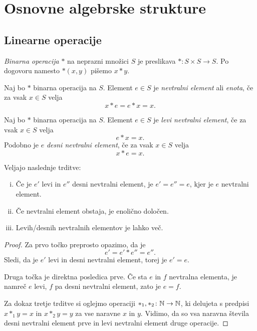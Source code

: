 \section{Osnovne algebrske strukture}

\subsection{Linearne operacije}

\begin{definicija}
\emph{Binarna operacija} $*$ na neprazni množici $S$ je preslikava $*\colon S\times S\to S$. Po dogovoru namesto $*(x,y)$ pišemo $x*y$.
\end{definicija}

\begin{definicija}
Naj bo $*$ binarna operacija na $S$. Element $e\in S$ je \emph{nevtralni element} ali \emph{enota}, če za vsak $x\in S$ velja
\[
x*e=e*x=x.
\]
\end{definicija}

\begin{definicija}
Naj bo $*$ binarna operacija na $S$. Element $e\in S$ je \emph{levi nevtralni element}, če za vsak $x\in S$ velja
\[
e*x=x.
\]
Podobno je $e$ \emph{desni nevtralni element}, če za vsak $x\in S$ velja
\[
x*e=x.
\]
\end{definicija}

\begin{trditev}
Veljajo naslednje trditve:

\begin{enumerate}[i)]
\item Če je $e'$ levi in $e''$ desni nevtralni element, je $e'=e''=e$, kjer je $e$ nevtralni element.
\item Če nevtralni element obstaja, je enolično določen.
\item Levih/desnih nevtralnih elementov je lahko več.
\end{enumerate}
\end{trditev}

\begin{proof}
Za prvo točko preprosto opazimo, da je
\[
e'=e'*e''=e''.
\]
Sledi, da je $e'$ levi in desni nevtralni element, torej je $e'=e$.

Druga točka je direktna posledica prve. Če sta $e$ in $f$ nevtralna elementa, je namreč $e$ levi, $f$ pa desni nevtralni element, zato je $e=f$.

Za dokaz tretje trditve si oglejmo operaciji $*_1,*_2\colon\mathbb{N}\to\mathbb{N}$, ki delujeta s predpisi $x*_1y=x$ in $x*_2y=y$ za vse naravne $x$ in $y$. Vidimo, da so vsa naravna števila desni nevtralni element prve in levi nevtralni element druge operacije.
\end{proof}

